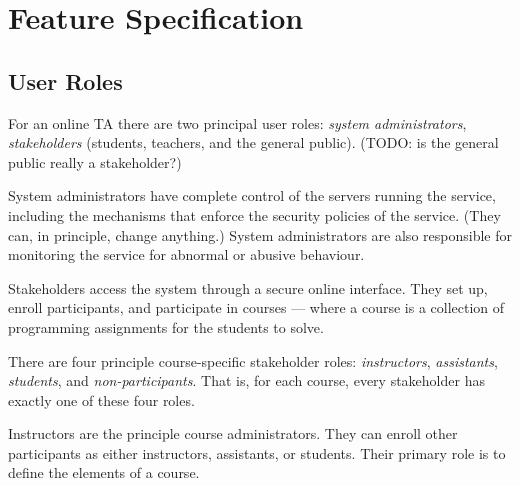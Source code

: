 
\chapter{Feature Specification}



\section{User Roles}


For an online TA there are two principal user roles: \emph{system
administrators}, \emph{stakeholders} (students, teachers, and the general
public). (TODO: is the general public really a stakeholder?) 



System administrators have complete control of the servers running the service,
including the mechanisms that enforce the security policies of the service.
(They can, in principle, change anything.) System administrators are also
responsible for monitoring the service for abnormal or abusive behaviour.


Stakeholders access the system through a secure online interface. They set up,
enroll participants, and participate in courses --- where a course is a
collection of programming assignments for the students to solve.


There are four principle course-specific stakeholder roles: \emph{instructors},
\emph{assistants}, \emph{students}, and \emph{non-participants}. That is, for
each course, every stakeholder has exactly one of these four roles.

Instructors are the principle course administrators. They can enroll other
participants as either instructors, assistants, or students. Their primary role
is to define the elements of a course.

